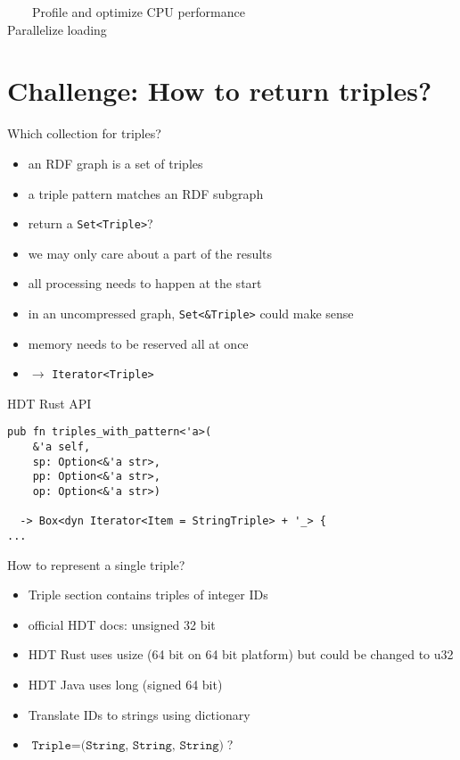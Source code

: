 \documentclass[14pt,aspectratio=169]{beamer}
\newcommand{\imageslide}[4][]
{
\begin{frame}[plain]{~~~~#2}
\vspace{0.2em}
\centering\makebox[\linewidth]{\texttt{[image: \#3]}}
\\#1
\note{#4}
\end{frame}
}
\newcommand\con{\item[$-$]}
\begin{document}
\imageslide[Parallelize loading]{Profile and optimize CPU performance}{img/parallel.png}{}

\section{Challenge: How to return triples?}

\begin{frame}{Which collection for triples?}
\begin{itemize}
\item an RDF graph is a set of triples
\item a triple pattern matches an RDF subgraph
\item return a \texttt{Set<Triple>}?
\pause
\con we may only care about a part of the results
\con all processing needs to happen at the start
\item in an uncompressed graph, \texttt{Set<\&Triple>} could make sense
\con memory needs to be reserved all at once
\item $\rightarrow$ \texttt{Iterator<Triple>}
\end{itemize}
\end{frame}

\begin{frame}[fragile]{HDT Rust API}
\small
\begin{verbatim}
pub fn triples_with_pattern<'a>(
    &'a self,
    sp: Option<&'a str>,
    pp: Option<&'a str>,
    op: Option<&'a str>)

  -> Box<dyn Iterator<Item = StringTriple> + '_> {
...
\end{verbatim}
\end{frame}

\begin{frame}{How to represent a single triple?}
\centering
{}\\
\begin{itemize}
\item Triple section contains triples of integer IDs
\item official HDT docs: unsigned 32 bit
\item HDT Rust uses usize (64 bit on 64 bit platform) but could be changed to u32
\item HDT Java uses long (signed 64 bit)
\item Translate IDs to strings using dictionary
\item $\texttt{Triple} = \texttt{(String, String, String)}$?
\end{itemize}
\end{frame}
\end{document}
